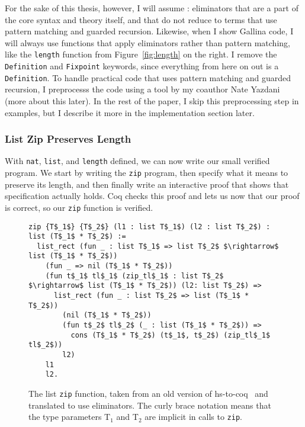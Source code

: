 For the sake of this thesis, however, I will assume : eliminators that are a part of the core syntax and theory itself,
and that do not reduce to terms that use pattern matching and guarded recursion.
Likewise, when I show Gallina code, I will always use functions that apply eliminators rather than pattern matching, like the \lstinline{length} function from Figure~\ref{fig:length}
on the right.
I remove the \lstinline{Definition} and \lstinline{Fixpoint} keywords, since everything from here on out is a \lstinline{Definition}.
To handle practical code that uses pattern matching and guarded recursion,
I preprocesss the code using a tool by my coauthor Nate Yazdani (more about this later). %
In the rest of the paper, I skip this preprocessing step in examples, but I describe it more in the implementation section later.

\subsubsection{List Zip Preserves Length}
\label{sec:verif}

With \lstinline{nat}, \lstinline{list}, and \lstinline{length} defined, we can now write our small verified program.
We start by writing the \lstinline{zip} program, then specify what it means to preserve its length, and then finally
write an interactive proof that shows that specification actually holds.
Coq checks this proof and lets us now that our proof is correct, so our \lstinline{zip} function is verified.

\begin{figure}
\begin{lstlisting}
zip {T$_1$} {T$_2$} (l1 : list T$_1$) (l2 : list T$_2$) : list (T$_1$ * T$_2$) :=
  list_rect (fun _ : list T$_1$ => list T$_2$ $\rightarrow$ list (T$_1$ * T$_2$))
    (fun _ => nil (T$_1$ * T$_2$))
    (fun t$_1$ tl$_1$ (zip_tl$_1$ : list T$_2$ $\rightarrow$ list (T$_1$ * T$_2$)) (l2: list T$_2$) =>
      list_rect (fun _ : list T$_2$ => list (T$_1$ * T$_2$))
        (nil (T$_1$ * T$_2$))
        (fun t$_2$ tl$_2$ (_ : list (T$_1$ * T$_2$)) =>
          cons (T$_1$ * T$_2$) (t$_1$, t$_2$) (zip_tl$_1$ tl$_2$))
        l2)
    l1
    l2.
\end{lstlisting}
\caption{The list \lstinline{zip} function, taken from an old version of hs-to-coq~\cite{TODO} and translated to use eliminators. The curly brace notation means that the
type parameters T$_1$ and T$_2$ are implicit in calls to \lstinline{zip}.}
\label{fig:zip}
\end{figure}

